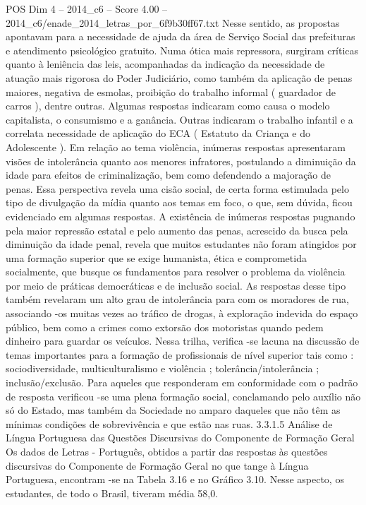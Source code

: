 \begin{textsample}{POS Dim 4 – 2014\_c6 – Score 4.00 – 2014\_c6/enade\_2014\_letras\_por\_6f9b30ff67.txt}
Nesse sentido, as propostas apontavam para a necessidade de ajuda da área de Serviço Social das prefeituras e atendimento psicológico gratuito.
Numa ótica mais repressora, surgiram críticas quanto à leniência das leis, acompanhadas da indicação da necessidade de atuação mais rigorosa do Poder Judiciário, como também da aplicação de penas maiores, negativa de esmolas, proibição do trabalho informal ( guardador de carros ), dentre outras.
Algumas respostas indicaram como causa o modelo capitalista, o consumismo e a ganância.
Outras indicaram o trabalho infantil e a correlata necessidade de aplicação do ECA ( Estatuto da Criança e do Adolescente ).
Em relação ao tema violência, inúmeras respostas apresentaram visões de intolerância quanto aos menores infratores, postulando a diminuição da idade para efeitos de criminalização, bem como defendendo a majoração de penas.
Essa perspectiva revela uma cisão social, de certa forma estimulada pelo tipo de divulgação da mídia quanto aos temas em foco, o que, sem dúvida, ficou evidenciado em algumas respostas.
A existência de inúmeras respostas pugnando pela maior repressão estatal e pelo aumento das penas, acrescido da busca pela diminuição da idade penal, revela que muitos estudantes não foram atingidos por uma formação superior que se exige humanista, ética e comprometida socialmente, que busque os fundamentos para resolver o problema da violência por meio de práticas democráticas e de inclusão social.
As respostas desse tipo também revelaram um alto grau de intolerância para com os moradores de rua, associando -os muitas vezes ao tráfico de drogas, à exploração indevida do espaço público, bem como a crimes como extorsão dos motoristas quando pedem dinheiro para guardar os veículos.
Nessa trilha, verifica -se lacuna na discussão de temas importantes para a formação de profissionais de nível superior tais como : sociodiversidade, multiculturalismo e violência ; tolerância/intolerância ; inclusão/exclusão.
Para aqueles que responderam em conformidade com o padrão de resposta verificou -se uma plena formação social, conclamando pelo auxílio não só do Estado, mas também da Sociedade no amparo daqueles que não têm as mínimas condições de sobrevivência e que estão nas ruas. 3.3.1.5 Análise de Língua Portuguesa das Questões Discursivas do Componente de Formação Geral Os dados de Letras - Português, obtidos a partir das respostas às questões discursivas do Componente de Formação Geral no que tange à Língua Portuguesa, encontram -se na Tabela 3.16 e no Gráfico 3.10.
Nesse aspecto, os estudantes, de todo o Brasil, tiveram média 58,0.

\end{textsample}

